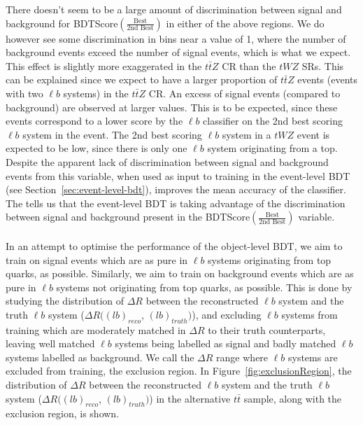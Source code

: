 There doesn't seem to be a large amount of discrimination between signal and background for BDTScore$(\frac{\text{Best}}{\text{2nd Best}})$ in either of the above regions. We do however see some discrimination in bins near a value of 1, where the number of background events exceed the number of signal events, which is what we expect. This effect is slightly more exaggerated in the $t\bar{t}Z$ CR than the $tWZ$ SRs. This can be explained since we expect to have a larger proportion of $t\bar{t}Z$ events (events with two $\ell b$ systems) in the $t\bar{t}Z$ CR. An excess of signal events (compared to background) are observed at larger values. This is to be expected, since these events correspond to a lower score by the $\ell b$ classifier on the 2nd best scoring $\ell b$ system in the event. The 2nd best scoring $\ell b$ system in a $tWZ$ event is expected to be low, since there is only one $\ell b$ system originating from a top. Despite the apparent lack of discrimination between signal and background events from this variable, when used as input to training in the event-level BDT (see Section~\ref{sec:event-level-bdt}), improves the mean accuracy of the classifier. The tells us that the event-level BDT is taking advantage of the discrimination between signal and background present in the BDTScore$(\frac{\text{Best}}{\text{2nd Best}})$ variable.\\\\

In an attempt to optimise the performance of the object-level BDT, we aim to train on signal events which are as pure in $\ell b$ systems originating from top quarks, as possible. Similarly, we aim to train on background events which are as pure in $\ell b$ systems not originating from top quarks, as possible. This is done by studying the distribution of $\Delta R$ between the reconstructed $\ell b$ system and the truth $\ell b$ system ($\Delta R((lb)_{reco}$, $(lb)_{truth})$), and excluding $\ell b$ systems from training which are moderately matched in $\Delta R$ to their truth counterparts, leaving well matched $\ell b$ systems being labelled as signal and badly matched $\ell b$ systems labelled as background. We call the $\Delta R$ range where $\ell b$ systems are excluded from training, the exclusion region. In Figure~\ref{fig:exclusionRegion}, the distribution of $\Delta R$ between the reconstructed $\ell b$ system and the truth $\ell b$ system ($\Delta R((lb)_{reco}$, $(lb)_{truth})$) in the alternative $t\bar{t}$ sample, along with the exclusion region, is shown.

